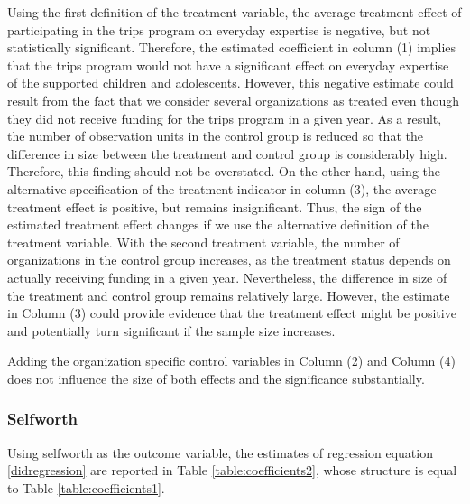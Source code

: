 \documentclass[12pt, a4paper, titlepage]{article}\usepackage[]{graphicx}\usepackage[]{color}
\begin{document}
Using the first definition of the treatment variable, the average treatment effect of participating in the trips program on everyday expertise is negative, but not statistically significant. Therefore, the estimated coefficient in column (1) implies that the trips program would not have a significant effect on everyday expertise of the supported children and adolescents. However, this negative estimate could result from the fact that we consider several organizations as treated even though they did not receive funding for the trips program in a given year. As a result, the number of observation units in the control group is reduced so that the difference in size between the treatment and control group is considerably high. Therefore, this finding should not be overstated. On the other hand, using the alternative specification of the treatment indicator in column (3), the average treatment effect is positive, but remains insignificant. Thus, the sign of the estimated treatment effect changes if we use the alternative definition of the treatment variable. With the second treatment variable, the number of organizations in the control group increases, as the treatment status depends on actually receiving funding in a given year. Nevertheless, the difference in size of the treatment and control group remains relatively large. However, the estimate in Column (3) could provide evidence that the treatment effect might be positive and potentially turn significant if the sample size increases.

Adding the organization specific control variables in Column (2) and Column (4) does not influence the size of both effects and the significance substantially.

\subsubsection{Selfworth}

Using selfworth as the outcome variable, the estimates of regression equation \ref{didregression} are reported in Table \ref{table:coefficients2}, whose structure is equal to Table \ref{table:coefficients1}.
\end{document}

